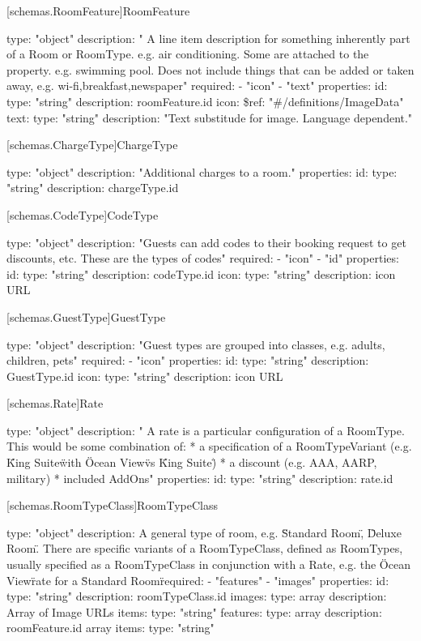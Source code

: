 [schemas.RoomFeature]{RoomFeature}
\begin{codeblock}
  type: "object"
  description: "
  A line item description for something inherently part of a Room or RoomType. 
    e.g. air conditioning.
  Some are attached to the property. 
    e.g. swimming pool.
  Does not include things that can be added or taken away, e.g. wi-fi,breakfast,newspaper"
  required:
  - "icon"
  - "text"
  properties:
    id:
      type: "string"
      description: roomFeature.id
    icon:
      \$ref: "#/definitions/ImageData"
    text:
      type: "string"
      description: "Text substitude for image. Language dependent."
\end{codeblock}

[schemas.ChargeType]{ChargeType}
\begin{codeblock}
  type: "object"
  description: "Additional charges to a room."
  properties:
    id:
      type: "string"
      description: chargeType.id
\end{codeblock}

[schemas.CodeType]{CodeType}
\begin{codeblock}
  type: "object"
  description: "Guests can add codes to their booking request to get discounts, etc. These are the types of codes"
  required:
  - "icon"
  - "id"
  properties:
    id:
      type: "string"
      description: codeType.id
    icon:
      type: "string"
      description: icon URL
\end{codeblock}

[schemas.GuestType]{GuestType}
\begin{codeblock}
  type: "object"
  description: "Guest types are grouped into classes, e.g. adults, children, pets"
  required:
  - "icon"
  properties:
    id:
      type: "string"
      description: GuestType.id
    icon:
      type: "string"
      description: icon URL
\end{codeblock}

[schemas.Rate]{Rate}
\begin{codeblock}
  type: "object"
  description: "
    A rate is a particular configuration of a RoomType. This would be some combination of:
    * a specification of a RoomTypeVariant (e.g. \"King Suite\" with \"Ocean View\" vs \"King Suite\")
    * a discount (e.g. AAA, AARP, military)
    * included AddOns"
  properties:
    id:
      type: "string"
      description: rate.id
\end{codeblock}

[schemas.RoomTypeClass]{RoomTypeClass}
\begin{codeblock}
  type: "object"
  description: A general type of room, e.g. \"Standard Room\", \"Deluxe Room\".  There are specific variants of a RoomTypeClass, defined as RoomTypes, usually specified as a RoomTypeClass in conjunction with a Rate, e.g. the \"Ocean View\" rate for a \"Standard Room\"
  required:
  - "features"
  - "images"
  properties:
    id:
      type: "string"
      description: roomTypeClass.id
    images:
      type: array
      description: Array of Image URLs
      items:
         type: "string"
    features:
      type: array
      description: roomFeature.id array
      items:
         type: "string"
\end{codeblock}

